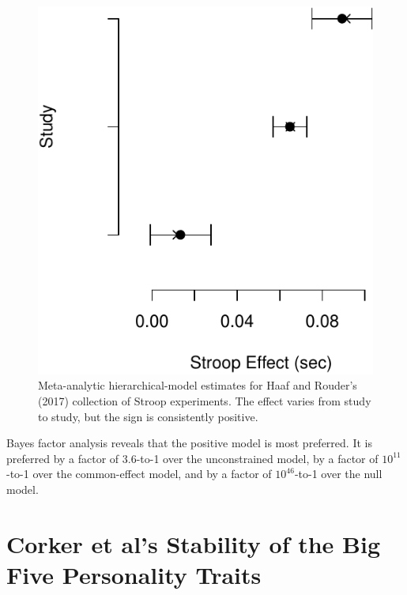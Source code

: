\documentclass[english,man]{apa6}
\theoremstyle{definition}
\theoremstyle{definition}
\theoremstyle{remark}
\begin{document}
\begin{figure}[htbp]
\centering
\includegraphics{p_files/figure-latex/hrEst-1.pdf}
\caption{\label{fig:hrEst}Meta-analytic hierarchical-model estimates for
Haaf and Rouder's (2017) collection of Stroop experiments. The effect
varies from study to study, but the sign is consistently positive.}
\end{figure}

Bayes factor analysis reveals that the positive model is most preferred.
It is preferred by a factor of 3.6-to-1 over the unconstrained model, by
a factor of \(10^{11}\)-to-1 over the common-effect model, and by a
factor of \(10^{46}\)-to-1 over the null model.

\section{Corker et al's Stability of the Big Five Personality
Traits}\label{corker-et-als-stability-of-the-big-five-personality-traits}
\end{document}
